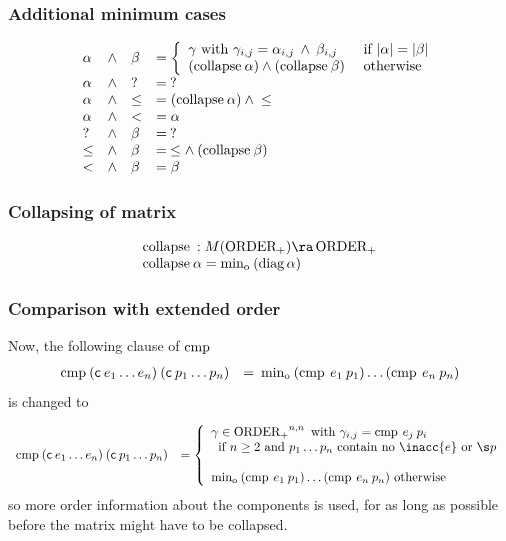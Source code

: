 \subsubsection{Additional minimum cases}
\[
\begin{array}{llll}
\alpha  & \wedge &\beta & = \left\{ \begin{array}{ll}
                          \gamma \mbox{ with } \gamma_{i,j} = \alpha_{i,j} \: \wedge \: \beta_{i,j} & \mbox{ if } \vert \alpha \vert = \vert \beta \vert \\
                          (\mathrm{collapse}\: \alpha) \wedge (\mathrm{collapse}\: \beta) & \mbox{ otherwise}  
                          \end{array}\right.\\ 
\alpha  & \wedge & ?     & = \: ? \\
\alpha  & \wedge & \leq  & = (\mathrm{collapse}\: \alpha) \: \wedge \: \leq \\
\alpha  & \wedge & <     & = \alpha \\
?       & \wedge & \beta & = \: ? \\
\leq    & \wedge & \beta & = \: \leq \wedge \: (\mathrm{collapse}\: \beta)\\
<       & \wedge & \beta & = \beta \\
\end{array}
\]

\subsubsection{Collapsing of matrix}
\[
\begin{array}{ll}
\multicolumn{2}{l}{\coll : M(\opl) \ra \opl}\\
\coll \alpha = \info \: (\diag \alpha) 
\end{array}
\]

\subsubsection{Comparison with extended order}
\noindent Now, the following clause of $\operatorname{cmp}$   
\[
\begin{array}[t]{ll}
\operatorname{cmp} \: (\mathsf{c} \: e_1 \ldots e_n) \: (\mathsf{c} \: p_1 \ldots p_n ) & = \: \operatorname{min_o} \: (\operatorname{cmp} \: e_1 \: p_1) \ldots (\operatorname{cmp} \: e_n \: p_n)\end{array}
\]
is changed to

\[
\begin{array}[t]{ll}
\cmp \: (\cc \: e_1 \ldots e_n) \: (\cc \: p_1 \ldots p_n ) & = 
\left\{\begin{array}{l} \gamma \in \opl^{n,n} \mbox{ with } \gamma_{i,j} = \cmp \: e_j \: p_i \\
\: \mbox{ if } n \geq 2 \mbox{ and } p_1 \ldots p_n \mbox{ contain no } \inacc{e} \mbox{ or } \s p \\
\\
\info \: (\cmp \: e_1 \: p_1) \ldots (\cmp \: e_n \: p_n) \mbox { otherwise}
\end{array}
\right.
\end{array}
\]
so more order information about the components is used, for as long as possible before the matrix might have to be collapsed.

